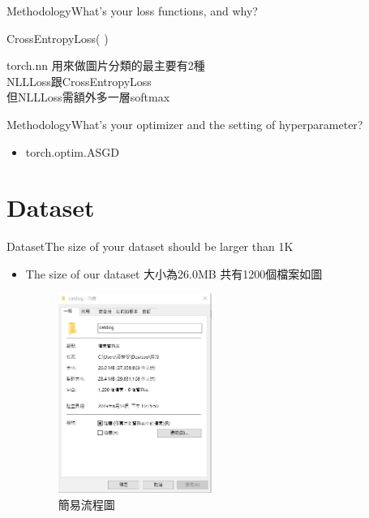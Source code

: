 \documentclass{beamer}
\begin{document}
\begin{frame}{Methodology}{What's your loss functions, and why? }
\begin{CJK*}{UTF8}{bsmi}
  \begin{itemize}
  \item {
CrossEntropyLoss( )\\
 \item {
torch.nn 用來做圖片分類的最主要有2種\\
NLLLoss跟CrossEntropyLoss\\
但NLLLoss需額外多一層softmax\\
  }
  }
  \end{itemize}
\end{CJK*}
\end{frame}

\begin{frame}{Methodology}{What's your optimizer and the setting of hyperparameter?}
\begin{CJK*}{UTF8}{bsmi}
  \begin{itemize}
  \item {
torch.optim.ASGD
  }
  \end{itemize}
\end{CJK*}
\end{frame}




\section{Dataset}


\begin{frame}{Dataset}{The size of your dataset should be larger than 1K }
\begin{CJK*}{UTF8}{bsmi}
  \begin{itemize}
  \item {
The size of our dataset 大小為26.0MB 共有1200個檔案如圖\\
\begin{figure}[h]
\begin{center}
\includegraphics[width=5cm]{dataset.jpg} 
\end{center} 
\label{fig:1} 
\caption{簡易流程圖} 
\end{figure}
  }
  \end{itemize}
\end{CJK*}
\end{frame}
\end{document}
